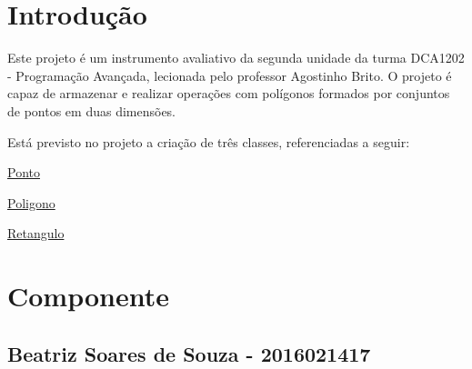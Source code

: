 \hypertarget{index_intro}{}\section{Introdução}\label{index_intro}
Este projeto é um instrumento avaliativo da segunda unidade da turma D\+C\+A1202 -\/ Programação Avançada, lecionada pelo professor Agostinho Brito. O projeto é capaz de armazenar e realizar operações com polígonos formados por conjuntos de pontos em duas dimensões.

Está previsto no projeto a criação de três classes, referenciadas a seguir\+:

\mbox{\hyperlink{classPonto}{Ponto}}

\mbox{\hyperlink{classPoligono}{Poligono}}

\mbox{\hyperlink{classRetangulo}{Retangulo}}\hypertarget{index_componente}{}\section{Componente}\label{index_componente}
\hypertarget{index_nome}{}\subsection{Beatriz Soares de Souza -\/ 2016021417}\label{index_nome}
